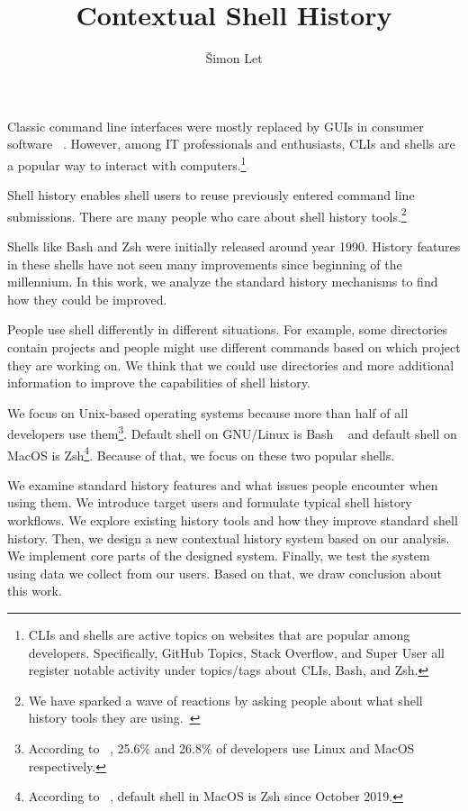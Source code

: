 \documentclass[thesis=M,english]{FITthesis}[2012/10/20]
\title{Contextual Shell History}
\author{Šimon Let} %
\let\myCite\cite
\renewcommand\cite{\unskip~\myCite}
\begin{document}
\begin{introduction}



Classic command line interfaces were mostly replaced by GUIs in consumer software \cite{norman2007ui}. However, among IT professionals and enthusiasts, CLIs and shells are a popular way to interact with computers.\footnote{CLIs and shells are active topics on websites that are popular among developers. Specifically, GitHub Topics, Stack Overflow, and Super User all register notable activity under topics/tags about CLIs, Bash, and Zsh.} 

Shell history enables shell users to reuse previously entered command line submissions.
There are many people who care about shell history tools.\footnote{We have sparked a wave of reactions by asking people about what shell history tools they are using.\cite{twitter-thread}}

Shells like Bash and Zsh were initially released around year 1990. History features in these shells have not seen many improvements since beginning of the millennium. In this work, we analyze the standard history mechanisms to find how they could be improved.

People use shell differently in different situations. For example, some directories contain projects and people might use different commands based on which project they are working on. We think that we could use directories and more additional information to improve the capabilities of shell history. 

We focus on Unix-based operating systems because more than half of all developers use them\footnote{According to \cite{stackoverflow2019devsurvey}, 25.6\% and 26.8\% of developers use Linux and MacOS respectively.}. 
Default shell on GNU/Linux is Bash \cite{ramey1994gnubash} and default shell on MacOS is Zsh\footnote{According to \cite{apple2019zsh}, default shell in MacOS is Zsh since October 2019.}. Because of that, we focus on these two popular shells.

We examine standard history features and what issues people encounter when using them. We introduce target users and formulate typical shell history workflows. We explore existing history tools and how they improve standard shell history. Then, we design a new contextual history system based on our analysis. We implement core parts of the designed system. Finally, we test the system using data we collect from our users. Based on that, we draw conclusion about this work.


\end{introduction}
\end{document}
